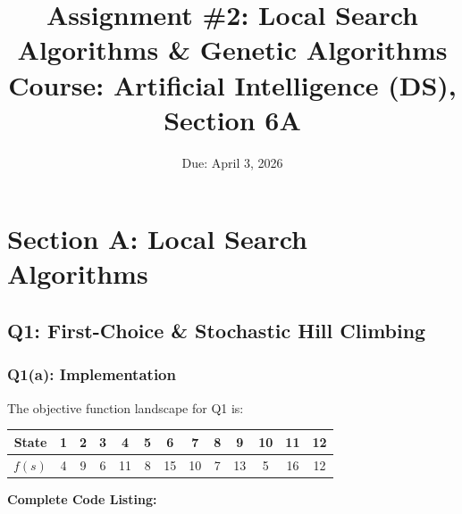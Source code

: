 \documentclass[12pt,a4paper]{article}
\title{\textbf{Assignment \#2: Local Search Algorithms \& Genetic Algorithms}\\
\large Course: Artificial Intelligence (DS), Section 6A}
\date{Due: April 3, 2026}
\begin{document}
\maketitle
\tableofcontents

\newpage
\section{Section A: Local Search Algorithms}

\subsection{Q1: First-Choice \& Stochastic Hill Climbing}

\subsubsection*{Q1(a): Implementation}

The objective function landscape for Q1 is:

\begin{center}
\begin{tabular}{ccccccccccccc}
\toprule
State & 1 & 2 & 3 & 4 & 5 & 6 & 7 & 8 & 9 & 10 & 11 & 12 \\
\midrule
$f(s)$ & 4 & 9 & 6 & 11 & 8 & 15 & 10 & 7 & 13 & 5 & 16 & 12 \\
\bottomrule
\end{tabular}
\end{center}

\textbf{Complete Code Listing:}
\end{document}
